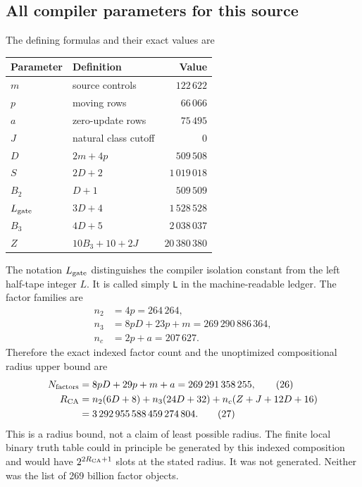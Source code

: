 \documentclass[11pt,a4paper]{article}
\numberwithin{equation}{section}
\newcommand{\code}[1]{\texttt{\small #1}}
\begin{document}
\subsection{All compiler parameters for this source}
The defining formulas and their exact values are
\begin{center}
\begin{tabular}{llr}\toprule
Parameter & Definition & Value\\\midrule
$m$ & source controls & $122\,622$\\
$p$ & moving rows & $66\,066$\\
$a$ & zero-update rows & $75\,495$\\
$J$ & natural class cutoff & $0$\\
$D$ & $2m+4p$ & $509\,508$\\
$S$ & $2D+2$ & $1\,019\,018$\\
$B_2$ & $D+1$ & $509\,509$\\
$L_{\rm gate}$ & $3D+4$ & $1\,528\,528$\\
$B_3$ & $4D+5$ & $2\,038\,037$\\
$Z$ & $10B_3+10+2J$ & $20\,380\,380$\\\bottomrule
\end{tabular}
\end{center}
The notation $L_{\rm gate}$ distinguishes the compiler isolation constant
from the left half-tape integer $L$. It is called simply \code{L} in the
machine-readable ledger. The factor families are
\begin{align*}
 n_2&=4p=264\,264,\\
 n_3&=8pD+23p+m=269\,290\,886\,364,\\
 n_c&=2p+a=207\,627.
\end{align*}
Therefore the exact indexed factor count and the unoptimized compositional
radius upper bound are
\begin{align}
 N_{\rm factors}&=8pD+29p+m+a=269\,291\,358\,255,       \tag{26}\\
 R_{\rm CA}&=n_2(6D+8)+n_3(24D+32)+n_c(Z+J+12D+16)\notag\\
            &=3\,292\,955\,588\,459\,274\,804.         \tag{27}
\end{align}
This is a radius bound, not a claim of least possible radius. The finite
local binary truth table could in principle be generated by this indexed
composition and would have $2^{2R_{\rm CA}+1}$ slots at the stated radius.
It was not generated. Neither was the list of 269 billion factor objects.
\end{document}
